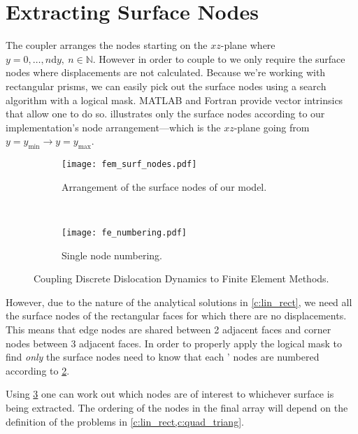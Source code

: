 	\section{Extracting Surface Nodes}
		The  coupler arranges the nodes starting on the $ xz $-plane where $ y = 0, \ldots, n \mathrm{d}y,~n\in \mathbb{N} $. However in order to couple  to  we only require the surface nodes where displacements are not calculated. Because we're working with rectangular prisms, we can easily pick out the surface nodes using a search algorithm with a logical mask. MATLAB and Fortran provide vector intrinsics that allow one to do so.  illustrates only the surface nodes according to our implementation's node arrangement---which is the $ xz $-plane going from $ y = y_{\textrm{min}} \to y = y_{\textrm{max}} $.
		\begin{figure}
			\centering
			\begin{subfigure}[t]{0.45\linewidth}
				\centering
				\texttt{[image: fem\_surf\_nodes.pdf]}
				\caption[Surface nodes of our  model.]{Arrangement of the surface nodes of our  model.}
				\label{f:fem_surf_nodes}
			\end{subfigure}
			~
			\begin{subfigure}[t]{0.45\linewidth}
				\centering
				\texttt{[image: fe\_numbering.pdf]}
				\caption[Single finite element node numbering.]{Single  node numbering.}
				\label{f:fe_numbering}
			\end{subfigure}
		\caption[Coupling Discrete Dislocation Dynamics to Finite Element Methods.]{Coupling Discrete Dislocation Dynamics to Finite Element Methods.}
		\label{f:fem_node_arr}
		\end{figure}
		However, due to the nature of the analytical solutions in \cref{c:lin_rect}, we need all the surface nodes of the rectangular faces for which there are no displacements. This means that edge nodes are shared between 2 adjacent faces and corner nodes between 3 adjacent faces. In order to properly apply the logical mask to find \emph{only} the surface nodes need to know that each ' nodes are numbered according to \cref{f:fe_numbering}.
		
		Using \cref{f:fem_node_arr} one can work out which nodes are of interest to whichever surface is being extracted. The ordering of the nodes in the final array will depend on the definition of the problems in \cref{c:lin_rect,c:quad_triang}.
		
